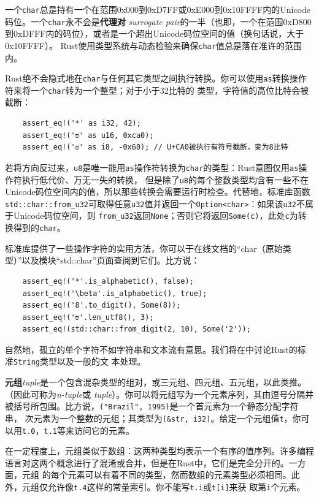 \smallskip
一个\texttt{char}总是持有一个在范围0x000到0xD7FF或0xE000到0x10FFFF内的Unicode码位。一个\texttt{char}永不会是\textbf{代理对}
\textit{surrogate pair}的一半（也即，一个在范围0xD800到0xDFFF内的码位），或者是一个超出Unicode码位空间的值（换句话说，大于0x10FFFF）。
Rust使用类型系统与动态检验来确保\texttt{char}值总是落在准许的范围内。

\medskip
Rust绝不会隐式地在\texttt{char}与任何其它类型之间执行转换。你可以使用\texttt{as}转换操作符来将一个\texttt{char}转为一个整型；对于小于32比特的
类型，字符值的高位比特会被截断：
\begin{verbatim}
    assert_eq!('*' as i32, 42);
    assert_eq!('ಠ' as u16, 0xca0);
    assert_eq!('ಠ' as i8, -0x60); // U+CA0被执行有符号截断，变为8比特
\end{verbatim}

\smallskip
若将方向反过来，\texttt{u8}是唯一能用\texttt{as}操作符转换为\texttt{char}的类型：Rust意图仅用\texttt{as}操作符执行低代价、万无一失的转换，
但是除了\texttt{u8}的每个整数类型均含有一些不在Unicode码位空间内的值，所以那些转换会需要运行时检查。代替地，标准库函数
\texttt{std::char::from\_u32}可取得任意\texttt{u32}值并返回一个\texttt{Option<char>}：如果该\texttt{u32}不属于Unicode码位空间，则
\texttt{from\_u32}返回\texttt{None}；否则它将返回\texttt{Some(c)}，此处\texttt{c}为转换得到的\texttt{char}。

\medskip
标准库提供了一些操作字符的实用方法，你可以于在线文档的“char（原始类型）”以及模块“std::char”页面查阅到它们。比方说：
\begin{verbatim}
    assert_eq!('*'.is_alphabetic(), false);
    assert_eq!('\beta'.is_alphabetic(), true);
    assert_eq!('8'.to_digit(), Some(8));
    assert_eq!('ಠ'.len_utf8(), 3);
    assert_eq!(std::char::from_digit(2, 10), Some('2'));
\end{verbatim}

\smallskip
自然地，孤立的单个字符不如字符串和文本流有意思。我们将在中讨论Rust的标准\texttt{String}类型以及一般的文
本处理。

\bigskip
{}
\textbf{元组}\textit{tuple}是一个包含混杂类型的组对，或三元组、四元组、五元组，以此类推。（因此可称为\textit{n-tuple}或
\textit{tuple}）。你可以将元组写为一个元素序列，其由逗号分隔并被括号所包围。比方说，\texttt{("Brazil", 1995)}是一个首元素为一个静态分配字符串，
次元素为一个整数的元组；其类型为\texttt{(\&str, i32)}。给定一个元组值\texttt{t}，你可以用\texttt{t.0}，\texttt{t.1}等来访问它的元素。

\medskip
在一定程度上，元组类似于数组：这两种类型均表示一个有序的值序列。许多编程语言对这两个概念进行了混淆或合并，但是在Rust中，它们是完全分开的。一方面，元组
的每个元素可以有着不同的类型，然而数组的元素类型必须相同。此外，元组仅允许像\texttt{t.4}这样的常量索引。你不能写\texttt{t.i}或\texttt{t[i]}来获
取第\texttt{i}个元素。

